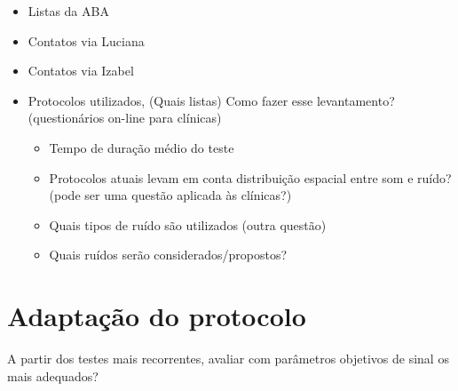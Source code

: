 \begin{itemize}
    \item Listas da ABA
    \item Contatos via Luciana
    \item Contatos via Izabel
    \item Protocolos utilizados, (Quais listas) Como fazer esse levantamento? (questionários on-line para clínicas)
    \begin{itemize}
    \item Tempo de duração médio do teste
    \item Protocolos atuais levam em conta distribuição espacial entre som e ruído? (pode ser uma questão aplicada às clínicas?)
    \item Quais tipos de ruído são utilizados (outra questão)
    \item Quais ruídos serão considerados/propostos? 
    \end{itemize}
\end{itemize}

\section{Adaptação do protocolo}

A partir dos testes mais recorrentes, avaliar com parâmetros objetivos de sinal os mais adequados? 


